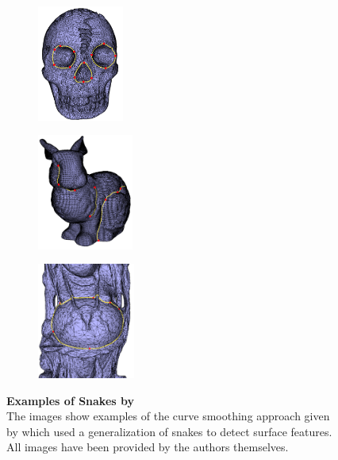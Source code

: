 \documentclass{stdlocal}
\begin{document}
\begin{figure}[b]
  \centering
  \begin{subfigure}[b]{0.32\linewidth}
    \centering
    \includegraphics[height=3.8cm]{images/lee2002-1.png}
  \end{subfigure}
  \begin{subfigure}[b]{0.32\linewidth}
    \centering
    \includegraphics[height=3.8cm]{images/lee2002-2.png}
  \end{subfigure}
  \begin{subfigure}[b]{0.32\linewidth}
    \centering
    \includegraphics[height=3.8cm]{images/lee2002-3.png}
  \end{subfigure}
  \caption[Examples of Snakes by \textcite{lee2002}]{%
    \textbf{Examples of Snakes by \textcite{lee2002}}\\
    The images show examples of the curve smoothing approach given by \textcite{lee2002} which used a generalization of snakes to detect surface features.
    All images have been provided by the authors themselves.
  }
  \label{fig:lee2002}
\end{figure}
\end{document}
